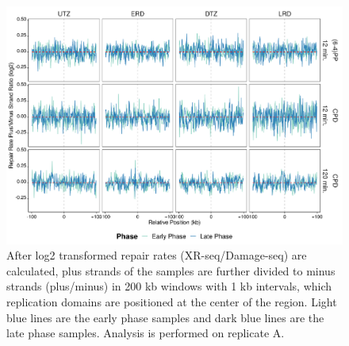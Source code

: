 \begin{figure}[H]
\begin{center}
\includegraphics[width=\textwidth]{Chapters/7_appendix/figures/supfig32}
\caption[Repair rate plus/minus phase ratio of replication domains in 200 kb (replicate A).]{After log2 transformed repair rates (XR-seq/Damage-seq) are calculated, plus strands of the samples are further divided to minus strands (plus/minus) in 200 kb windows with 1 kb intervals, which replication domains are positioned at the center of the region. Light blue lines are the early phase samples and dark blue lines are the late phase samples. Analysis is performed on replicate A.}
\label{supfig:rrpm200repdomainA}
\end{center}
\end{figure}

